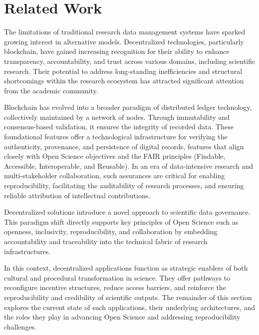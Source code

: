 \documentclass[final]{rc-book-2.14}
\begin{document}
\section{Related Work}

The limitations of traditional research data management systems have sparked growing interest in alternative models. Decentralized technologies, particularly blockchain, have gained increasing recognition for their ability to enhance transparency, accountability, and trust across various domains, including scientific research. Their potential to address long-standing inefficiencies and structural shortcomings within the research ecosystem has attracted significant attention from the academic community.

Blockchain has evolved into a broader paradigm of distributed ledger technology, collectively maintained by a network of nodes. Through immutability and consensus-based validation, it ensures the integrity of recorded data. These foundational features offer a technological infrastructure for verifying the authenticity, provenance, and persistence of digital records, features that align closely with Open Science objectives and the FAIR principles (Findable, Accessible, Interoperable, and Reusable). In an era of data-intensive research and multi-stakeholder collaboration, such assurances are critical for enabling reproducibility, facilitating the auditability of research processes, and ensuring reliable attribution of intellectual contributions.

Decentralized solutions introduce a novel approach to scientific data governance. This paradigm shift directly supports key principles of Open Science such as openness, inclusivity, reproducibility, and collaboration by embedding accountability and traceability into the technical fabric of research infrastructures.

In this context, decentralized applications function as strategic enablers of both cultural and procedural transformation in science. They offer pathways to reconfigure incentive structures, reduce access barriers, and reinforce the reproducibility and credibility of scientific outputs. The remainder of this section explores the current state of such applications, their underlying architectures, and the roles they play in advancing Open Science and addressing reproducibility challenges.
\end{document}

